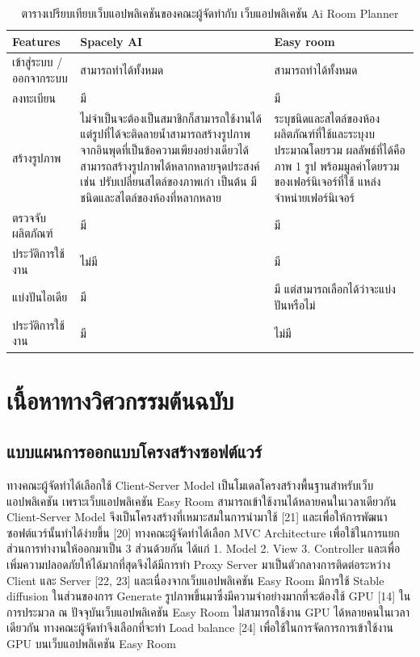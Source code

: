 \documentclass[12pt,oneside,openright,a4paper]{cpe-thai-project}
\begin{document}
\begin{enumerate}
\begin{table}[!h]
\caption{ตารางเปรียบเทียบเว็บแอปพลิเคชันของคณะผู้จัดทำกับ เว็บแอปพลิเคชัน Ai Room Planner }\label{tbl:planner-table}
  \begin{tabular}{|p{4cm}|p{5cm}|p{5cm}|}
  \hline
  \textbf{Features} & \textbf{Spacely AI} & \textbf{Easy room } \\
  \hline
  เข้าสู่ระบบ / ออกจากระบบ & สามารถทำได้ทั้งหมด & สามารถทำได้ทั้งหมด \\
  \hline
  ลงทะเบียน & มี & มี \\
  \hline
สร้างรูปภาพ & ไม่จำเป็นจะต้องเป็นสมาชิกก็สามารถใช้งานได้ แต่รูปที่ได้จะติดลายน้ำสามารถสร้างรูปภาพจากอินพุดที่เป็นข้อความเพียงอย่างเดียวได้
สามารถสร้างรูปภาพได้หลากหลายจุดประสงค์ เช่น ปรับเปลี่ยนสไตล์ของภาพเก่า เป็นต้น มีชนิดและสไตล์ของห้องที่หลากหลาย & ระบุชนิดและสไตล์ของห้อง ผลิตภัณฑ์ที่ใช้และระบุงบประมาณโดยรวม ผลลัพธ์ที่ได้คือ ภาพ 1 รูป พร้อมมูลค่าโดยรวมของเฟอร์นิเจอร์ที่ใช้ แหล่งจำหน่ายเฟอร์นิเจอร์ \\
  \hline
  ตรวจจับผลิตภัณฑ์ & มี & มี \\
  \hline
  ประวัติการใช้งาน & ไม่มี & มี \\
  \hline
  แบ่งปันไอเดีย & มี  & มี แต่สามารถเลือกได้ว่าจะแบ่งปันหรือไม่ \\
  \hline
  ประวัติการใช้งาน & มี & ไม่มี \\
  \hline
\end{tabular}
\end{table}

\end{enumerate}

\vspace{\fill}\clearpage

\section{เนื้อหาทางวิศวกรรมต้นฉบับ}

\subsection{แบบแผนการออกแบบโครงสร้างซอฟต์แวร์}
\hspace {18pt}ทางคณะผู้จัดทำได้เลือกใช้ Client-Server Model เป็นโมเดลโครงสร้างพื้นฐานสำหรับเว็บแอปพลิเคชัน เพราะเว็บแอปพลิเคชัน Easy Room สามารถเข้าใช้งานได้หลายคนในเวลาเดียวกัน Client-Server Model จึงเป็นโครงสร้างที่เหมาะสมในการนำมาใช้ [21] และเพื่อให้การพัฒนาซอฟต์แวร์นั้นทำได้ง่ายขึ้น [20] ทางคณะผู้จัดทำได้เลือก MVC Architecture เพื่อใช้ในการแยกส่วนการทำงานให้ออกมาเป็น 3 ส่วนด้วยกัน ได้แก่ 1. Model 2. View 3. Controller และเพื่อเพิ่มความปลอดภัยให้ได้มากที่สุดจึงได้มีการทำ Proxy Server มาเป็นตัวกลางการติดต่อระหว่าง Client และ Server [22, 23] และเนื่องจากเว็บแอปพลิเคชัน Easy Room มีการใช้ Stable diffusion ในส่วนของการ Generate รูปภาพขึ้นมาซึ่งมีความจำอย่างมากที่จะต้องใช้ GPU [14] ในการประมวล ณ ปัจจุบันเว็บแอปพลิเคชัน Easy Room ไม่สามารถใช้งาน GPU ได้หลายคนในเวลาเดียวกัน ทางคณะผู้จัดทำจึงเลือกที่จะทำ Load balance [24] เพื่อใช้ในการจัดการการเข้าใช้งาน GPU บนเว็บแอปพลิเคชัน Easy Room
\end{document}
